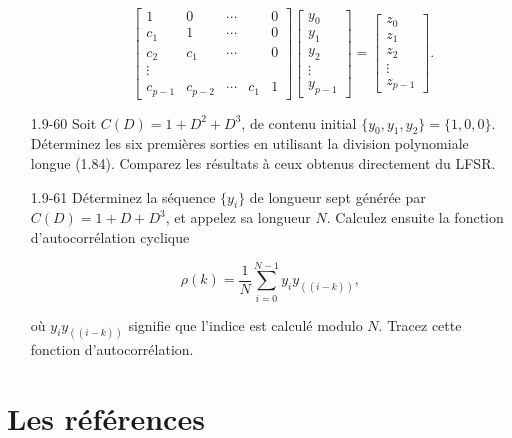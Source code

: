 \documentclass[10pt,twoside,a4paper]{book}
\begin{document}
\begin{enumerate}
\begin{enumerate}
    \begin{equation*}
      \begin{bmatrix}
        1 & 0 & \cdots & & 0 \\
        c_1 & 1 & \cdots & & 0 \\
        c_2 & c_1 & \cdots & & 0 \\
        \vdots \\
        c_{p-1} & c_{p-2} & \cdots & c_1 & 1
      \end{bmatrix}
      \begin{bmatrix}
        y_0 \\
        y_1 \\
        y_2 \\
        \vdots \\
        y_{p-1}
      \end{bmatrix}=
      \begin{bmatrix}
        z_0 \\
        z_1 \\
        z_2 \\
        \vdots \\
        z_{p-1}
      \end{bmatrix}.
    \end{equation*}
  \end{enumerate}
  \item[1.9-60] Soit $C(D) = 1+D^2+D^3$, de contenu initial $\{y_0,y_1,y_2\}=\{1,0,0\}$. Déterminez les six premières sorties en utilisant la division polynomiale longue (1.84). Comparez les résultats à ceux obtenus directement du LFSR.
  \item[1.9-61] Déterminez la séquence $\{y_i\}$ de longueur sept générée par $C(D)=1+D+D^3$, et appelez sa longueur $N$. Calculez ensuite la fonction d'autocorrélation cyclique
  
  \begin{equation*}
    \rho(k)=\frac{1}{N} \sum_{i=0}^{N-1} y_i y_{((i-k))},
  \end{equation*}

  \noindent
  où $y_i y_{((i-k))}$ signifie que l'indice est calculé modulo $N$. Tracez cette fonction d'autocorrélation.
\end{enumerate}

\section{Les références}
\end{document}
